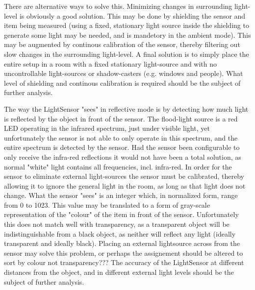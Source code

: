 There are alternative ways to solve this. Minimizing changes in surrounding light-level is obviously a good solution. This may be done by shielding the sensor and item being measured (using a fixed, stationary light source inside the shielding to generate some light may be needed, and is mandetory in the ambient mode). This may be augmented by continous calibration of the sensor, thereby filtering out slow changes in the surrounding light-level. A final solution is to simply place the entire setup in a room with a fixed stationary light-source and with no uncontrollable light-sources or shadow-casters (e.g. windows and people). What level of shielding and continous calibration is required should be the subject of further analysis.

The way the LightSensor "sees" in reflective mode is by detecting how much light is reflected by the object in front of the sensor. The flood-light source is a red LED operating in the infrared spectrum, just under visible light, yet unfortunately the sensor is not able to only operate in this spectrum, and the entire spectrum is detected by the sensor. Had the sensor been configurable to only receive the infra-red reflections it would not have been a total solution, as normal "white" light contains all frequencies, incl. infra-red. In order for the sensor to eliminate external light-sources the sensor must be calibrated, thereby allowing it to ignore the general light in the room, as long as that light does not change. What the sensor "sees" is an integer which, in normalized form, range from 0 to 1023. This value may be translated to a form of gray-scale representation of the "colour" of the item in front of the sensor. Unfortunately this does not match well with transparency, as a transparent object will be indistinguishable from a black object, as neither will reflect any light (ideally transparent and ideally black). Placing an external lightsource across from the sensor may solve this problem, or perhaps the assignement should be altered to sort by colour not transparency??? The accuracy of the LightSensor at different distances from the object, and in different external light levels should be the subject of further analysis.

